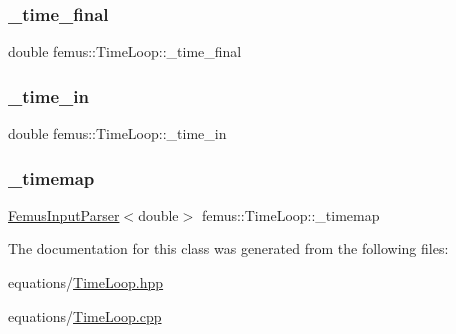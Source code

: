 \subsubsection{\texorpdfstring{\+\_\+time\+\_\+final}{\_time\_final}}
{\footnotesize\ttfamily double femus\+::\+Time\+Loop\+::\+\_\+time\+\_\+final}

\mbox{\label{classfemus_1_1_time_loop_a70b7f421b4428653119817938db3ad04}} 
\subsubsection{\texorpdfstring{\+\_\+time\+\_\+in}{\_time\_in}}
{\footnotesize\ttfamily double femus\+::\+Time\+Loop\+::\+\_\+time\+\_\+in}

\mbox{\label{classfemus_1_1_time_loop_a0ad720cecced417ce134d55b54b2425d}} 
\subsubsection{\texorpdfstring{\+\_\+timemap}{\_timemap}}
{\footnotesize\ttfamily \mbox{\hyperlink{classfemus_1_1_femus_input_parser}{Femus\+Input\+Parser}}$<$double$>$ femus\+::\+Time\+Loop\+::\+\_\+timemap}



The documentation for this class was generated from the following files\+:\begin{DoxyCompactItemize}
\item 
equations/\mbox{\hyperlink{_time_loop_8hpp}{Time\+Loop.\+hpp}}\item 
equations/\mbox{\hyperlink{_time_loop_8cpp}{Time\+Loop.\+cpp}}\end{DoxyCompactItemize}
